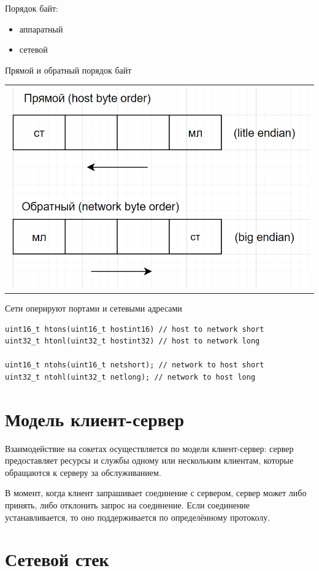 Порядок байт:

\begin{itemize}
\item аппаратный
\item сетевой
\end{itemize}

Прямой и обратный порядок байт

  \begin{table}[H]
  \centering
  \begin{tabular}{p{1\linewidth}}
    \centering
    \includegraphics[width=0.8\linewidth]{./images/3.png}
  \end{tabular}
\end{table}

Сети оперируют портами и сетевыми адресами

\begin{lstlisting}
uint16_t htons(uint16_t hostint16) // host to network short
uint32_t htonl(uint32_t hostint32) // host to network long

uint16_t ntohs(uint16_t netshort); // network to host short
uint32_t ntohl(uint32_t netlong); // network to host long
\end{lstlisting}


\section{Модель клиент-сервер}
Взаимодействие на сокетах осуществляется по модели клиент-сервер: сервер предоставляет ресурсы и службы одному или нескольким клиентам, которые обращаются к серверу за обслуживанием. 

В момент, когда клиент запрашивает соединение с сервером, сервер может либо принять, либо отклонить запрос на соединение. Если соединение устанавливается, то оно поддерживается по определённому протоколу.
\section{Сетевой стек}

